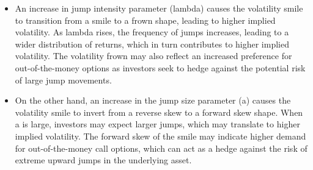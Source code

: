 \documentclass[11pt]{article}
\begin{document}
\begin{itemize}
\item
  An increase in jump intensity parameter (lambda) causes the volatility
  smile to transition from a smile to a frown shape, leading to higher
  implied volatility. As lambda rises, the frequency of jumps increases,
  leading to a wider distribution of returns, which in turn contributes
  to higher implied volatility. The volatility frown may also reflect an
  increased preference for out-of-the-money options as investors seek to
  hedge against the potential risk of large jump movements.
\item
  On the other hand, an increase in the jump size parameter (a) causes
  the volatility smile to invert from a reverse skew to a forward skew
  shape. When a is large, investors may expect larger jumps, which may
  translate to higher implied volatility. The forward skew of the smile
  may indicate higher demand for out-of-the-money call options, which
  can act as a hedge against the risk of extreme upward jumps in the
  underlying asset.
\end{itemize}


    
    
    
\end{document}
